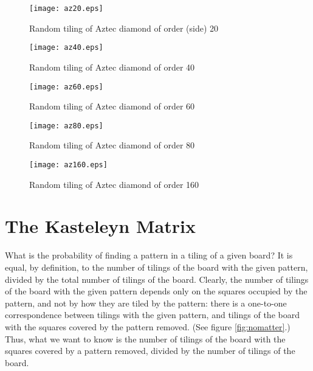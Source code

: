 \documentclass[10pt,reqno]{amsart}
\theoremstyle{plain}
\theoremstyle{definition}
\theoremstyle{remark}
\begin{document}
\begin{figure}
        \begin{minipage}[b]{0.5\linewidth}
                \centering \texttt{[image: az20.eps]}
                \caption{Random tiling of Aztec diamond of order (side) 20}\label{fig:b}   
        \end{minipage}
        \begin{minipage}[b]{0.5\linewidth}
                \centering \texttt{[image: az40.eps]}
                \caption{Random tiling of Aztec diamond of order 40}\label{fig:c}
        \end{minipage}
\end{figure}
\begin{figure}
        \begin{minipage}[b]{0.5\linewidth}
                \centering \texttt{[image: az60.eps]}
                \caption{Random tiling of Aztec diamond of order 60} \label{fig:d}   
        \end{minipage}
        \begin{minipage}[b]{0.5\linewidth}
                \centering \texttt{[image: az80.eps]}
                \caption{Random tiling of Aztec diamond of order 80}\label{fig:e}
        \end{minipage}
\end{figure}
\begin{figure}
	\centering \texttt{[image: az160.eps]}
	\caption{Random tiling of Aztec diamond of order 160}\label{fig:f}
\end{figure}

\section{The Kasteleyn Matrix}

What is the probability of finding a pattern in a tiling of a given board?
It is equal, by definition, to the number of tilings of the
board with the given pattern, divided by the total number of tilings
of the board. Clearly, the number of tilings of the board with the
given pattern depends only on the squares occupied by the pattern, and not
by how they are tiled by the pattern: there is a one-to-one correspondence
between tilings with the given pattern, and tilings of the
board with the squares covered by the pattern removed. (See figure 
\ref{fig:nomatter}.) Thus, what we want to know is the number of tilings
of the board with the squares covered by a pattern removed, divided
by the number of tilings of the board.
\end{document}

